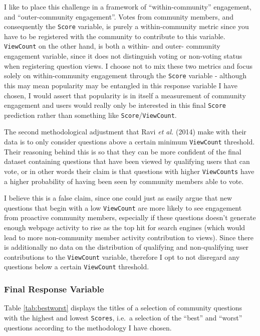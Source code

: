 \documentclass[11pt,preprint, authoryear]{article}
\numberwithin{equation}{section}
\begin{document}
\normalsize

I like to place this challenge in a framework of ``within-community''
engagement, and ``outer-community engagement''. Votes from community
members, and consequently the \texttt{Score} variable, is purely a
within-community metric since you have to be registered with the
community to contribute to this variable. \texttt{ViewCount} on the
other hand, is both a within- and outer- community engagement variable,
since it does not distinguish voting or non-voting status when
registering question views. I choose not to mix these two metrics and
focus solely on within-community engagement through the \texttt{Score}
variable - although this may mean popularity may be entangled in this
response variable I have chosen, I would assert that popularity is in
itself a measurement of community engagement and users would really only
be interested in this final \texttt{Score} prediction rather than
something like \texttt{Score}/\texttt{ViewCount}.

The second methodological adjustment that Ravi \emph{et al.} (2014) make
with their data is to only consider questions above a certain minimum
\texttt{ViewCount} threshold. Their reasoning behind this is so that
they can be more confident of the final dataset containing questions
that have been viewed by qualifying users that can vote, or in other
words their claim is that questions with higher \texttt{ViewCounts} have
a higher probability of having been seen by community members able to
vote.

I believe this is a false claim, since one could just as easily argue
that new questions that begin with a low \texttt{ViewCount} are more
likely to see engagement from proactive community members, especially if
these questions doesn't generate enough webpage activity to rise as the
top hit for search engines (which would lead to more non-community
member activity contribution to views). Since there is additionally no
data on the distribution of qualifying and non-qualifying user
contributions to the \texttt{ViewCount} variable, therefore I opt to not
disregard any questions below a certain \texttt{ViewCount} threshold.

\subsubsection{Final Response Variable}\label{final-response-variable}

Table \ref{tab:bestworst} displays the titles of a selection of
community questions with the highest and lowest \texttt{Scores}, i.e.~a
selection of the ``best'' and ``worst'' questions according to the
methodology I have chosen.
\end{document}
